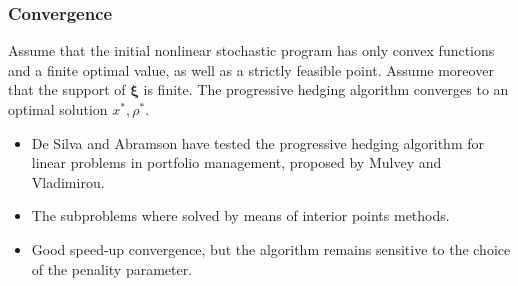 \documentclass[french]{beamer}
\def\bxi{\boldsymbol\xi}
\begin{document}
\begin{frame}
\frametitle{Convergence}

\begin{theorem}
Assume that the initial nonlinear stochastic program has only convex functions and a finite optimal value, as well as a strictly feasible point.
Assume moreover that the support of $\bxi$ is finite.
The progressive hedging algorithm converges to an optimal solution $x^*, \rho^*$.
\end{theorem}

\begin{itemize}
\item
De Silva and Abramson have tested the progressive hedging algorithm for linear problems in portfolio management, proposed by Mulvey and Vladimirou.
\item
The subproblems where solved by means of interior points methods.
\item
Good speed-up convergence, but the algorithm remains sensitive to the choice of the penality parameter.
\end{itemize}

\end{frame}
\end{document}
